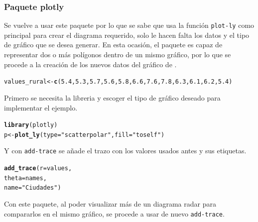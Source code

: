 \documentclass{article}\usepackage[]{graphicx}\usepackage[]{color}
\makeatletter
\newcommand{\hlnum}[1]{\textcolor[rgb]{0.686,0.059,0.569}{#1}}%
\newcommand{\hlstr}[1]{\textcolor[rgb]{0.192,0.494,0.8}{#1}}%
\newcommand{\hlstd}[1]{\textcolor[rgb]{0.345,0.345,0.345}{#1}}%
\newcommand{\hlkwb}[1]{\textcolor[rgb]{0.69,0.353,0.396}{#1}}%
\newcommand{\hlkwd}[1]{\textcolor[rgb]{0.737,0.353,0.396}{\textbf{#1}}}%
\newenvironment{kframe}{%
 \def\at@end@of@kframe{}%
 \ifinner\ifhmode%
  \def\at@end@of@kframe{\end{minipage}}%
  \begin{minipage}{\columnwidth}%
 \fi\fi%
 \def\FrameCommand##1{\hskip\@totalleftmargin \hskip-\fboxsep
 \colorbox{shadecolor}{##1}\hskip-\fboxsep
     \hskip-\linewidth \hskip-\@totalleftmargin \hskip\columnwidth}%
 \MakeFramed {\advance\hsize-\width
   \@totalleftmargin\z@ \linewidth\hsize
   \@setminipage}}%
 {\par\unskip\endMakeFramed%
 \at@end@of@kframe}
\newenvironment{knitrout}{}{} %
\makeatother
\begin{document}
\subsubsection{Paquete plotly}
Se vuelve a usar este paquete %
por lo que se sabe que usa la funci\'on \texttt{plot-ly} como principal para crear el diagrama requerido, solo le hacen falta los datos y el tipo de gr\'afico que se desea generar. En esta ocasi\'on, el paquete es capaz de representar dos o m\'as pol\'igonos dentro de un mismo gr\'afico, por lo que se procede a la creaci\'on de los nuevos datos del gr\'afico de %
.

\begin{knitrout}
\color{fgcolor}\begin{kframe}
\begin{alltt}
\hlstd{values_rural} \hlkwb{<-} \hlkwd{c}\hlstd{(}\hlnum{5.4}\hlstd{,} \hlnum{5.3}\hlstd{,} \hlnum{5.7}\hlstd{,} \hlnum{5.6}\hlstd{,} \hlnum{5.8}\hlstd{,} \hlnum{6.6}\hlstd{,} \hlnum{7.6}\hlstd{,} \hlnum{7.8}\hlstd{,} \hlnum{6.3}\hlstd{,} \hlnum{6.1}\hlstd{,} \hlnum{6.2}\hlstd{,} \hlnum{5.4}\hlstd{)}
\end{alltt}
\end{kframe}
\end{knitrout}
Primero se necesita la libreria y escoger el tipo de gr\'afico deseado para implementar el ejemplo.
\begin{knitrout}
\color{fgcolor}\begin{kframe}
\begin{alltt}
\hlkwd{library}(plotly)
p <- \hlkwd{plot_ly}(type = \hlstr{"scatterpolar"}, fill = \hlstr{"toself"}) %
\end{alltt}
\end{kframe}
\end{knitrout}
Y con \texttt{add-trace} se a\~nade el trazo con los valores usados antes y sus etiquetas.
\begin{knitrout}
\color{fgcolor}\begin{kframe}
\begin{alltt}
  \hlkwd{add_trace}( r = values,
             theta = names,
             name = \hlstr{"Ciudades"}) %
\end{alltt}
\end{kframe}
\end{knitrout}
Con este paquete, al poder visualizar m\'as de un diagrama radar para compararlos en el mismo gr\'afico, se procede a usar de nuevo \texttt{add-trace}.
\end{document}
